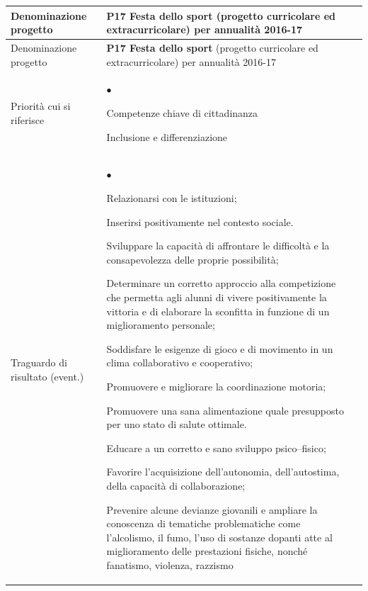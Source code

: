 \documentclass[12pt,a4paper,oneside]{memoir}
\newenvironment{elenco}{\begin{list}{$\bullet$}{%
              \setlength{\leftmargin}{4mm}%
              \setlength{\rightmargin}{1mm}%
               \setlength{\itemindent}{0mm}%
               \setlength{\labelwidth}{2mm}%
               \setlength{\labelsep}{2mm}%
              \setlength{\itemsep}{-\parsep}%
              \setlength{\partopsep}{0pt}%
              \setlength{\topsep}{0pt}%
             \setlength{\parskip}{0pt}%
              }}{\end{list}}
\begin{document}
\begin{footnotesize}
\begin{longtable}{|>{\raggedright}p{2.5cm}|>{\raggedright\arraybackslash}P{10cm}|}
\hline
{}
\label{P17}Denominazione progetto&\textbf{P17 Festa dello sport} (progetto curricolare ed extracurricolare) per annualità 2016-17\\ \hline \endfirsthead
\hline
{}
Denominazione progetto&\textbf{P17 Festa dello sport} (progetto curricolare ed extracurricolare) per annualità 2016-17\\ \hline \endhead
{}
\endfoot
\hline
\endlastfoot
Priorità cui si riferisce&\begin{elenco}
\item Competenze chiave di cittadinanza 
\item Inclusione e differenziazione
\end{elenco}\\[-4mm] \hline
Traguardo di risultato (event.)&\begin{elenco}
\item Relazionarsi con le  istituzioni;
\item Inserirsi positivamente nel contesto sociale.
\item Sviluppare la capacità di affrontare le difficoltà e la consapevolezza delle proprie possibilità;
\item Determinare un corretto approccio alla competizione che permetta agli alunni di vivere positivamente la vittoria e di elaborare la sconfitta in funzione di un miglioramento personale;
\item Soddisfare le esigenze di gioco e di movimento in un clima collaborativo e cooperativo;
\item Promuovere e migliorare la coordinazione motoria;
\item Promuovere una sana alimentazione quale presupposto per uno stato di salute ottimale. 
\item Educare a un corretto e sano sviluppo psico–fisico;
\item Favorire l'acquisizione dell'autonomia, dell'autostima, della capacità di collaborazione;
\item Prevenire alcune devianze giovanili e ampliare la conoscenza di tematiche problematiche come l'alcolismo, il fumo, l'uso di sostanze dopanti atte al miglioramento delle prestazioni fisiche, nonché fanatismo, violenza, razzismo
\end{elenco}\\[-4mm] \hline

\end{longtable}
\end{footnotesize}
\end{document}

